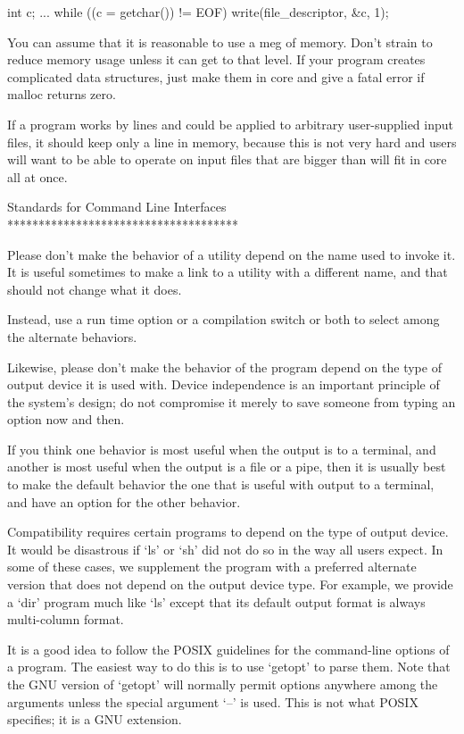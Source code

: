      int c;
     ...
     while ((c = getchar()) != EOF)
             write(file_descriptor, &c, 1);

   You can assume that it is reasonable to use a meg of memory.  Don't
strain to reduce memory usage unless it can get to that level.  If your
program creates complicated data structures, just make them in core and
give a fatal error if malloc returns zero.

   If a program works by lines and could be applied to arbitrary
user-supplied input files, it should keep only a line in memory, because
this is not very hard and users will want to be able to operate on input
files that are bigger than will fit in core all at once.

Standards for Command Line Interfaces
*************************************

   Please don't make the behavior of a utility depend on the name used
to invoke it.  It is useful sometimes to make a link to a utility with
a different name, and that should not change what it does.

   Instead, use a run time option or a compilation switch or both to
select among the alternate behaviors.

   Likewise, please don't make the behavior of the program depend on the
type of output device it is used with.  Device independence is an
important principle of the system's design; do not compromise it merely
to save someone from typing an option now and then.

   If you think one behavior is most useful when the output is to a
terminal, and another is most useful when the output is a file or a
pipe, then it is usually best to make the default behavior the one that
is useful with output to a terminal, and have an option for the other
behavior.

   Compatibility requires certain programs to depend on the type of
output device.  It would be disastrous if `ls' or `sh' did not do so in
the way all users expect.  In some of these cases, we supplement the
program with a preferred alternate version that does not depend on the
output device type.  For example, we provide a `dir' program much like
`ls' except that its default output format is always multi-column
format.

   It is a good idea to follow the POSIX guidelines for the
command-line options of a program.  The easiest way to do this is to use
`getopt' to parse them.  Note that the GNU version of `getopt' will
normally permit options anywhere among the arguments unless the special
argument `--' is used.  This is not what POSIX specifies; it is a GNU
extension.

